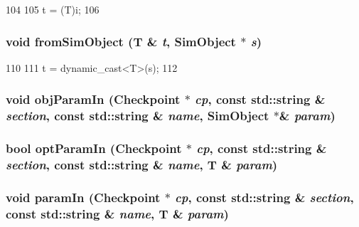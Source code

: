 \begin{DoxyCode}
104 {
105     t = (T)i;
106 }
\end{DoxyCode}
\hypertarget{serialize_8hh_a6a1352b94f67a077730295ec6e250bb0}{
\subsubsection[{fromSimObject}]{\setlength{\rightskip}{0pt plus 5cm}void fromSimObject (T \& {\em t}, \/  {\bf SimObject} $\ast$ {\em s})}}
\label{serialize_8hh_a6a1352b94f67a077730295ec6e250bb0}



\begin{DoxyCode}
110 {
111     t = dynamic_cast<T>(s);
112 }
\end{DoxyCode}
\hypertarget{serialize_8hh_ada6b7e3d8b5db63bb9afe0f7e07b5f88}{
\subsubsection[{objParamIn}]{\setlength{\rightskip}{0pt plus 5cm}void objParamIn ({\bf Checkpoint} $\ast$ {\em cp}, \/  const std::string \& {\em section}, \/  const std::string \& {\em name}, \/  {\bf SimObject} $\ast$\& {\em param})}}
\label{serialize_8hh_ada6b7e3d8b5db63bb9afe0f7e07b5f88}
\hypertarget{serialize_8hh_a3ba0bcb28a0cc5738908c18632babcbb}{
\subsubsection[{optParamIn}]{\setlength{\rightskip}{0pt plus 5cm}bool optParamIn ({\bf Checkpoint} $\ast$ {\em cp}, \/  const std::string \& {\em section}, \/  const std::string \& {\em name}, \/  T \& {\em param})}}
\label{serialize_8hh_a3ba0bcb28a0cc5738908c18632babcbb}
\hypertarget{serialize_8hh_ac6aea34b594f3d7c3e69d650e2d8e37b}{
\subsubsection[{paramIn}]{\setlength{\rightskip}{0pt plus 5cm}void paramIn ({\bf Checkpoint} $\ast$ {\em cp}, \/  const std::string \& {\em section}, \/  const std::string \& {\em name}, \/  T \& {\em param})}}
